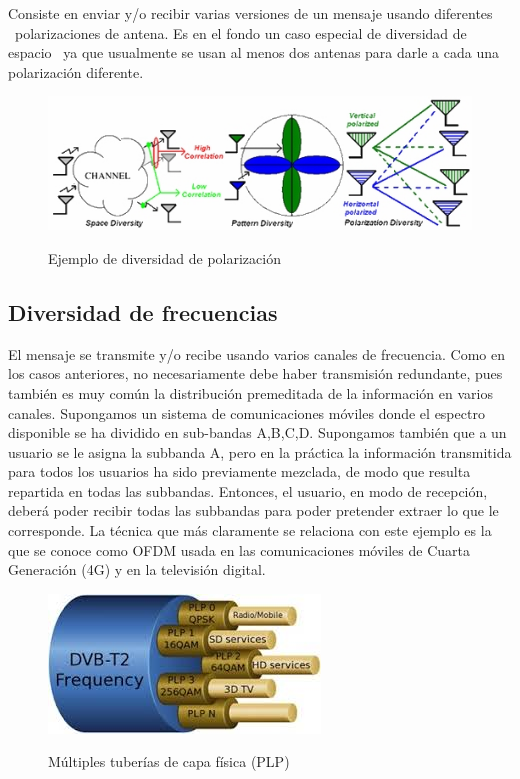 Consiste en enviar y/o recibir varias versiones de un mensaje usando diferentes \ 
polarizaciones de antena. Es en el fondo un caso especial de diversidad de espacio \ 
ya que usualmente se usan al menos dos antenas para darle a cada una polarización diferente. 

\begin{figure}[h!]
	\captionsetup{justification = raggedright, singlelinecheck = false}
	\caption{Ejemplo de diversidad de polarización} 
	\centering
	\includegraphics[scale=1]{Imagenes/Polarizacion.png}
	\label{fig:Polarizacion}
\end{figure}

\subsection{Diversidad de frecuencias}	

El mensaje se transmite y/o recibe usando varios canales de frecuencia. Como en los casos anteriores, no necesariamente debe haber transmisión redundante, pues también es muy común la distribución premeditada de la información en varios canales. Supongamos un sistema de comunicaciones móviles donde el espectro disponible se ha dividido en sub-bandas A,B,C,D. Supongamos también que a un usuario se le asigna la subbanda A, pero en la práctica la información transmitida para todos los usuarios ha sido previamente mezclada, de modo que resulta repartida en todas las subbandas. Entonces, el usuario, en modo de recepción, deberá poder recibir todas las subbandas para poder pretender extraer lo que le corresponde. La técnica que más claramente se relaciona con este ejemplo es la que se conoce como OFDM usada en las comunicaciones móviles de Cuarta Generación (4G) y en la televisión digital. \\

\begin{figure}[h!]
	\captionsetup{justification = raggedright, singlelinecheck = false}
	\caption{Múltiples tuberías de capa física (PLP)} 
	\centering
	\includegraphics[scale=1]{Imagenes/DVB-T2.png}
	\label{fig:DVB-T2}
\end{figure}

